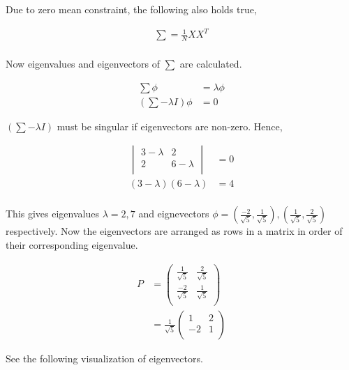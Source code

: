 \documentclass[11pt, a4paper]{article}
\begin{document}
Due to zero mean constraint, the following also holds true,

\begin{align*}
	\sum = \frac{1}{N} XX^T \\
\end{align*}

Now eigenvalues and eigenvectors of $\sum$ are calculated.

\begin{align*}
	\sum \phi              & = \lambda \phi \\
	(\sum - \lambda I)\phi & = 0            
\end{align*}

$(\sum - \lambda I)$ must be singular if eigenvectors are non-zero. Hence,

\begin{align*}
	\begin{vmatrix} 3 - \lambda & 2           \\
	2                           & 6 - \lambda \\ 
	\end{vmatrix}               & = 0         \\
	(3 - \lambda)(6 - \lambda)  & = 4         \\	                
\end{align*}

This gives eigenvalues $\lambda = 2, 7$ and eignevectors $\phi = (\frac{-2}{\sqrt{5}}, \frac{1}{\sqrt{5}}), (\frac{1}{\sqrt{5}}, \frac{2}{\sqrt{5}}) $ respectively. Now the eigenvectors are arranged as rows in a matrix in order of their corresponding eigenvalue. 


\begin{align*}
	P & = \begin{pmatrix} \frac{1}{\sqrt{5}}   & \frac{2}{\sqrt{5}} \\
	\frac{-2}{\sqrt{5}} & \frac{1}{\sqrt{5}} \\ 
	\end{pmatrix}  \\
	  & = \frac{1}{\sqrt{5}} \begin{pmatrix} 1 & 2                  \\
	-2 & 1\\ 
	\end{pmatrix}	                
\end{align*}


See the following visualization of eigenvectors.
\end{document}
